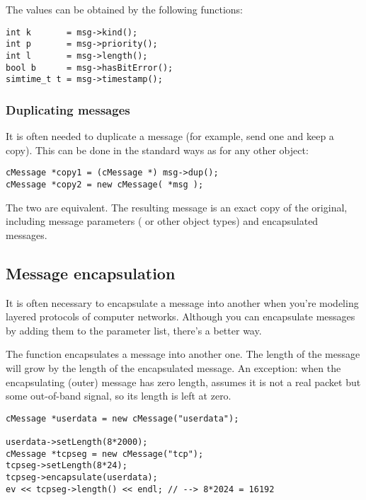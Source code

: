 The values can be obtained by the following functions:

\begin{verbatim}
int k       = msg->kind();
int p       = msg->priority();
int l       = msg->length();
bool b      = msg->hasBitError();
simtime_t t = msg->timestamp();
\end{verbatim}


\subsubsection{Duplicating messages}


It is often needed to duplicate a message (for example, send
one and keep a copy). This can be done in the standard ways as
for any other {\opp} object:

\begin{verbatim}
cMessage *copy1 = (cMessage *) msg->dup();
cMessage *copy2 = new cMessage( *msg );
\end{verbatim}


The two are equivalent. The resulting message is an exact copy
of the original, including message parameters ( or other
object types) and encapsulated messages.




\subsection{Message encapsulation}

It is often necessary to encapsulate a
message into another when you're modeling
layered protocols of computer networks. Although you can encapsulate
messages by adding them to the parameter list, there's a better way.


The  function encapsulates a message
into another one. The length of the message will grow by the length of
the encapsulated message. An exception: when the encapsulating (outer)
message has zero length, {\opp} assumes it is not a real packet but
some out-of-band signal, so its length is left at zero.

\begin{verbatim}
cMessage *userdata = new cMessage("userdata");

userdata->setLength(8*2000);
cMessage *tcpseg = new cMessage("tcp");
tcpseg->setLength(8*24);
tcpseg->encapsulate(userdata);
ev << tcpseg->length() << endl; // --> 8*2024 = 16192
\end{verbatim}


